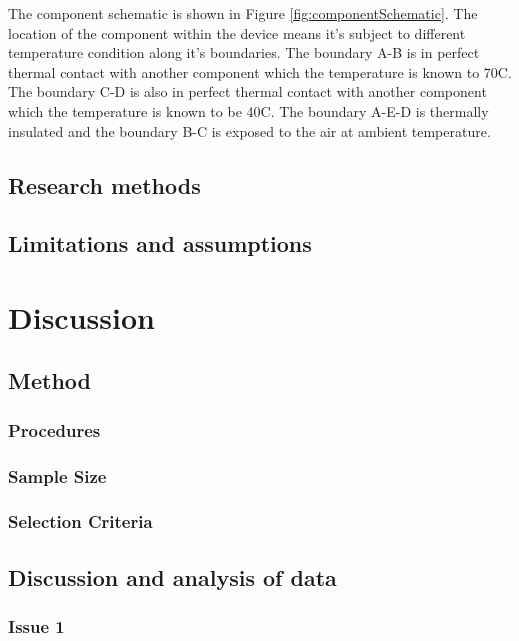 \documentclass[12pt,a4paper]{article}
\begin{document}
The component schematic is shown in Figure \ref{fig:componentSchematic}. The location of the component within the device means it's subject to different temperature condition along it's boundaries. The boundary A-B is in perfect thermal contact with another component which the temperature is known to 70\degree C. The boundary C-D is also in perfect thermal contact with another component which the temperature is known to be 40\degree C. The boundary A-E-D is thermally insulated and the boundary B-C is exposed to the air at ambient temperature.

\subsection{Research methods}


\subsection{Limitations and assumptions}

\section{Discussion}

\subsection{Method}

\subsubsection{Procedures}

\subsubsection{Sample Size}

\subsubsection{Selection Criteria}

\subsection{Discussion and analysis of data}

\subsubsection{Issue 1}
\end{document}
